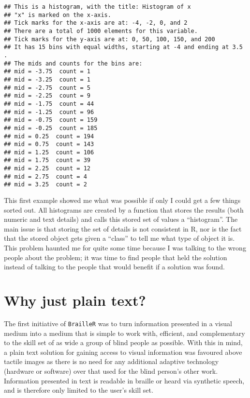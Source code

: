 \documentclass[
]{book}
\begin{document}
\begin{verbatim}
## This is a histogram, with the title: Histogram of x
## "x" is marked on the x-axis.
## Tick marks for the x-axis are at: -4, -2, 0, and 2 
## There are a total of 1000 elements for this variable.
## Tick marks for the y-axis are at: 0, 50, 100, 150, and 200 
## It has 15 bins with equal widths, starting at -4 and ending at 3.5 .
## The mids and counts for the bins are:
## mid = -3.75  count = 1 
## mid = -3.25  count = 1 
## mid = -2.75  count = 5 
## mid = -2.25  count = 9 
## mid = -1.75  count = 44 
## mid = -1.25  count = 96 
## mid = -0.75  count = 159 
## mid = -0.25  count = 185 
## mid = 0.25  count = 194 
## mid = 0.75  count = 143 
## mid = 1.25  count = 106 
## mid = 1.75  count = 39 
## mid = 2.25  count = 12 
## mid = 2.75  count = 4 
## mid = 3.25  count = 2
\end{verbatim}

This first example showed me what was possible if only I could get a few things sorted out. All histograms are created by a function that stores the results (both numeric and text details) and calls this stored set of values a ``histogram''. The main issue is that storing the set of details is not consistent in R, nor is the fact that the stored object gets given a ``class'' to tell me what type of object it is. This problem haunted me for quite some time because I was talking to the wrong people about the problem; it was time to find people that held the solution instead of talking to the people that would benefit if a solution was found.

\hypertarget{why-just-plain-text}{%
\section{Why just plain text?}\label{why-just-plain-text}}

The first initiative of \texttt{BrailleR} was to turn information presented in a visual medium into a medium that is simple to work with, efficient, and complementary to the skill set of as wide a group of blind people as possible. With this in mind, a plain text solution for gaining access to visual information was favoured above tactile images as there is no need for any additional adaptive technology (hardware or software) over that used for the blind person's other work.
Information presented in text is readable in braille or heard via synthetic speech, and is therefore only limited to the user's skill set.
\end{document}
